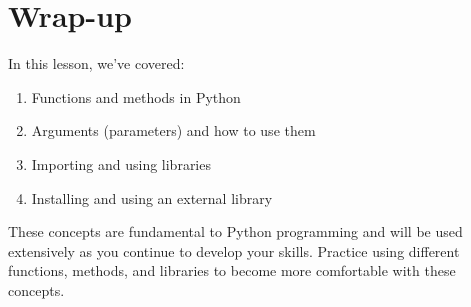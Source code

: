 \documentclass[
  letterpaper,
  DIV=11,
  numbers=noendperiod]{scrreprt}
\providecommand{\tightlist}{%
  \setlength{\itemsep}{0pt}\setlength{\parskip}{0pt}}\usepackage{longtable,booktabs,array}
\begin{document}
\section{Wrap-up}\label{wrap-up-1}

In this lesson, we've covered:

\begin{enumerate}
\def\labelenumi{\arabic{enumi}.}
\tightlist
\item
  Functions and methods in Python
\item
  Arguments (parameters) and how to use them
\item
  Importing and using libraries
\item
  Installing and using an external library
\end{enumerate}

These concepts are fundamental to Python programming and will be used
extensively as you continue to develop your skills. Practice using
different functions, methods, and libraries to become more comfortable
with these concepts.
\end{document}
